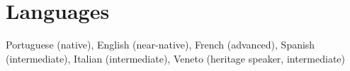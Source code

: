 \documentclass[letterpaper,10pt]{article}
\begin{document}
%
%
%
%
%
%
%
%
%
%
%

\section{Languages}

Portuguese (native), English (near-native), French (advanced), Spanish (intermediate), Italian (intermediate), Veneto (heritage speaker, intermediate)


\vspace{0.3cm}
\end{document}
